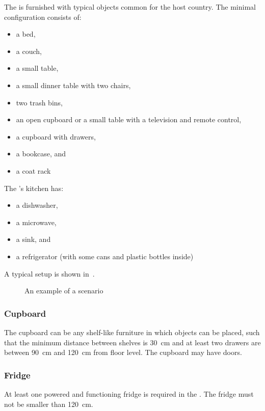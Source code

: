 The \Arena{} is furnished with typical objects common for the host country.
The minimal configuration consists of:
\begin{itemize}
	\item a bed,
	\item a couch,
	\item a small table,
	\item a small dinner table with two chairs,
	\item two trash bins,
	\item an open cupboard or a small table with a television and remote control,
	\item a cupboard with drawers,
	\item a bookcase, and
	\item a coat rack
\end{itemize}
The \Arena{}'s kitchen has:
\begin{itemize}
	\item a dishwasher,
	\item a microwave,
	\item a sink, and
	\item a refrigerator (with some cans and plastic bottles inside)
\end{itemize}
A typical \Arena{} setup is shown in~.
\begin{figure}[tbp]
	\centering
	\caption{An example of a \RoboCup\AtHome{} scenario}\label{fig:arena}
\end{figure}

\subsubsection{Cupboard}

The cupboard can be any shelf-like furniture in which objects can be placed, such that the minimum distance between shelves is \SI{30}{\centi\meter} and at least two drawers are between \SI{90}{\centi\meter} and \SI{120}{\centi\meter} from floor level.
The cupboard may have doors.

\subsubsection{Fridge}

At least one powered and functioning fridge is required in the \Arena.
The fridge must not be smaller than \SI{120}{\centi\meter}.

